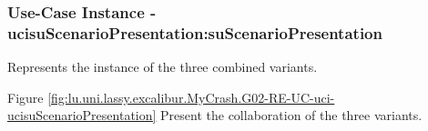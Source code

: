 
	\subsubsection{Use-Case Instance - ucisuScenarioPresentation:suScenarioPresentation}
	
	Represents the instance of the three combined variants.		  
	\begin{operationmodel}
	
	\end{operationmodel} 

	
	Figure \ref{fig:lu.uni.lassy.excalibur.MyCrash.G02-RE-UC-uci-ucisuScenarioPresentation}
	Present the collaboration of the three variants.
	
